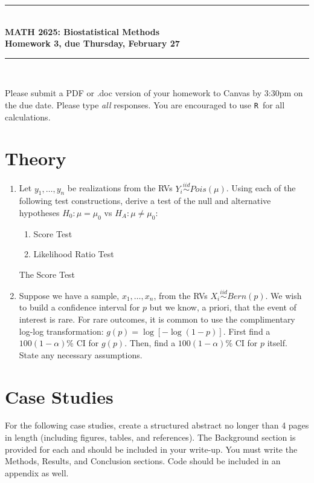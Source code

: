 \documentclass{article}
\newcommand{\HRule}{\rule{\linewidth}{0.5mm}}
\newcommand{\R}{\texttt{R}}
\begin{document}
	\begin{center}
		\HRule \\[0.1cm]
		\vspace{0.1cm}
		{ \LARGE \bfseries MATH 2625: Biostatistical Methods\\[0.5cm] Homework 3, due Thursday, February 27 } \\[0.1cm]
		\HRule \\[0.1cm]
	\end{center}
	
	Please submit a PDF or .doc version of your homework to Canvas by 3:30pm on the due date. Please type \emph{all} responses. You are encouraged to use \R\ for all calculations.
		
	\section*{Theory}
	\begin{enumerate}
		\item Let $y_1, \ldots, y_n$ be realizations from the RVs $Y_i \stackrel{iid}{\sim} Pois(\mu)$. Using each of the following test constructions, derive a test of the null and alternative hypotheses $H_0: \mu = \mu_0$ vs $H_A: \mu \neq \mu_0$:
		\begin{enumerate}
			\item Score Test
			\item Likelihood Ratio Test
		\end{enumerate}

		The Score Test
		
		\item Suppose we have a sample, $x_1, \ldots, x_n$, from the RVs $X_i \stackrel{iid}{\sim} Bern(p)$. We wish to build a confidence interval for $p$ but we know, a priori, that the event of interest is rare. For rare outcomes, it is common to use the complimentary log-log transformation: $g(p) = \log\left[ -\log(1-p) \right]$. First find a $100(1-\alpha)$\% CI for $g(p)$. Then, find a $100(1-\alpha)$\% CI for $p$ itself. State any necessary assumptions.

	\end{enumerate}

	\newpage

	\section*{Case Studies}
	For the following case studies, create a structured abstract no longer than 4 pages in length (including figures, tables, and references). The Background section is provided for each and should be included in your write-up. You must write the Methods, Results, and Conclusion sections. Code should be included in an appendix as well.
\end{document}
